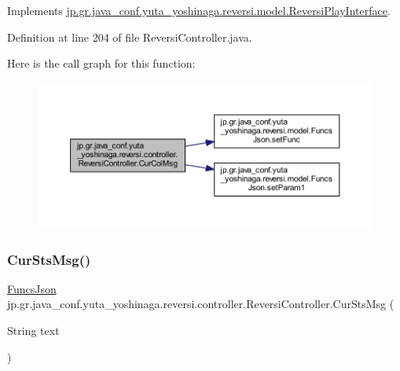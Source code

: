 Implements \hyperlink{interfacejp_1_1gr_1_1java__conf_1_1yuta__yoshinaga_1_1reversi_1_1model_1_1_reversi_play_interface_a32a831288d0964d1c3a8bd58f539cfda}{jp.\+gr.\+java\+\_\+conf.\+yuta\+\_\+yoshinaga.\+reversi.\+model.\+Reversi\+Play\+Interface}.



Definition at line 204 of file Reversi\+Controller.\+java.

Here is the call graph for this function\+:
\nopagebreak
\begin{figure}[H]
\begin{center}
\leavevmode
\includegraphics[width=350pt]{classjp_1_1gr_1_1java__conf_1_1yuta__yoshinaga_1_1reversi_1_1controller_1_1_reversi_controller_aa4c4d8fe61727c848170cff7120e82db_cgraph}
\end{center}
\end{figure}
\mbox{\label{classjp_1_1gr_1_1java__conf_1_1yuta__yoshinaga_1_1reversi_1_1controller_1_1_reversi_controller_a54cfbfa89d25bb2db441473ba53a5140}} 
\subsubsection{\texorpdfstring{Cur\+Sts\+Msg()}{CurStsMsg()}}
{\footnotesize\ttfamily \hyperlink{classjp_1_1gr_1_1java__conf_1_1yuta__yoshinaga_1_1reversi_1_1model_1_1_funcs_json}{Funcs\+Json} jp.\+gr.\+java\+\_\+conf.\+yuta\+\_\+yoshinaga.\+reversi.\+controller.\+Reversi\+Controller.\+Cur\+Sts\+Msg (\begin{DoxyParamCaption}\item[{String}]{text }\end{DoxyParamCaption})}



